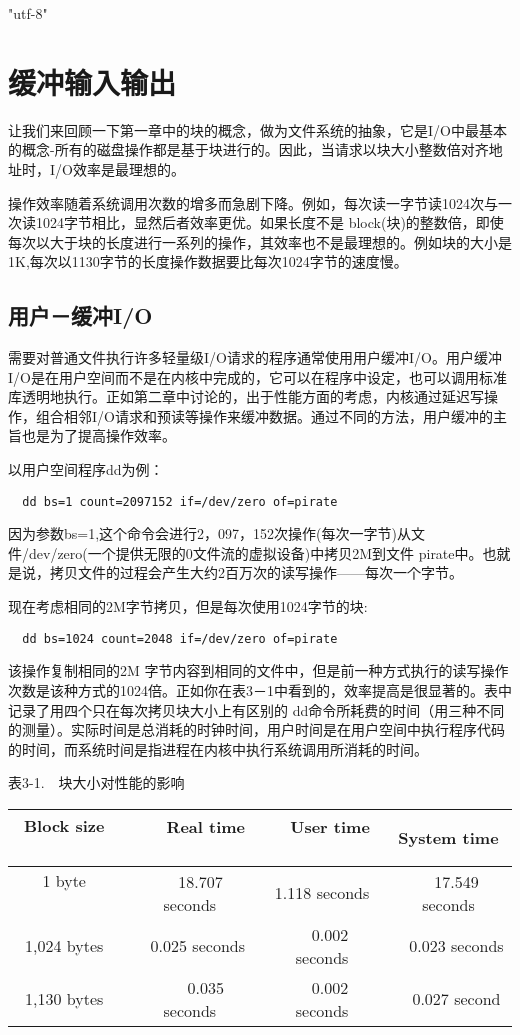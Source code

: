\ifx\atempxetex\usewhat
\XeTeXinputencoding "utf-8"
\fi
{}

\chapter{缓冲输入输出}

  让我们来回顾一下第一章中的块的概念，做为文件系统的抽象，它是I/O中最基本的概念-所有的磁盘操作都是基于块进行的。因此，当请求以块大小整数倍对齐地址时，I/O效率是最理想的。

  操作效率随着系统调用次数的增多而急剧下降。例如，每次读一字节读1024次与一次读1024字节相比，显然后者效率更优。如果长度不是 block(块)的整数倍，即使每次以大于块的长度进行一系列的操作，其效率也不是最理想的。例如块的大小是1K,每次以1130字节的长度操作数据要比每次1024字节的速度慢。 

\section{用户－缓冲I/O}
  需要对普通文件执行许多轻量级I/O请求的程序通常使用用户缓冲I/O。用户缓冲I/O是在用户空间而不是在内核中完成的，它可以在程序中设定，也可以调用标准库透明地执行。正如第二章中讨论的，出于性能方面的考虑，内核通过延迟写操作，组合相邻I/O请求和预读等操作来缓冲数据。通过不同的方法，用户缓冲的主旨也是为了提高操作效率。

以用户空间程序dd为例：
\begin{lstlisting}
  dd bs=1 count=2097152 if=/dev/zero of=pirate
\end{lstlisting}

因为参数bs=1,这个命令会进行2，097，152次操作(每次一字节)从文件/dev/zero(一个提供无限的0文件流的虚拟设备)中拷贝2M到文件 pirate中。也就是说，拷贝文件的过程会产生大约2百万次的读写操作——每次一个字节。

现在考虑相同的2M字节拷贝，但是每次使用1024字节的块:
\begin{lstlisting}
  dd bs=1024 count=2048 if=/dev/zero of=pirate
\end{lstlisting}

该操作复制相同的2M 字节内容到相同的文件中，但是前一种方式执行的读写操作次数是该种方式的1024倍。正如你在表3－1中看到的，效率提高是很显著的。表中记录了用四个只在每次拷贝块大小上有区别的 dd命令所耗费的时间（用三种不同的测量）。实际时间是总消耗的时钟时间，用户时间是在用户空间中执行程序代码的时间，而系统时间是指进程在内核中执行系统调用所消耗的时间。

表3-1.　块大小对性能的影响

\begin{tabular}{cccc}
Block size 　&　　Real time 　   &　User time 　  &  System time\\ \hline
1 byte 　　　&　  18.707 seconds &  1.118 seconds &　17.549 seconds\\
1,024 bytes　&  　0.025 seconds  &　0.002 seconds &　0.023 seconds\\
1,130 bytes  &　　0.035 seconds  &　0.002 seconds &　0.027 second\\
\end{tabular}



